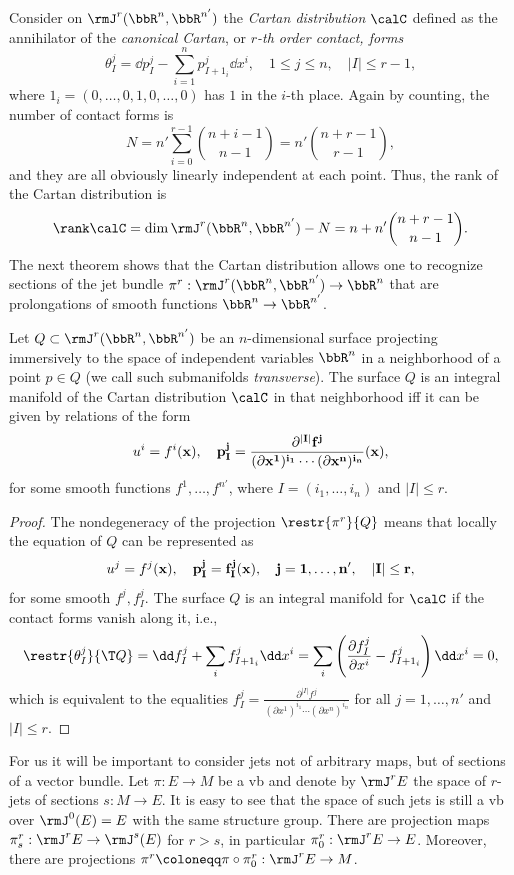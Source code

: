 Consider on $\rmJ^r(\bbR^n,\bbR^{n'})$ the \emph{Cartan distribution} $\calC$ defined as the annihilator of the \emph{canonical Cartan}, or \emph{$r$-th order contact, forms} 
\[\theta^j_I=\dd p^j_I-\sum_{i=1}^n p^j_{I+1_i}\dd x^i,\quad 1\leq j\leq n,\quad |I|\leq r-1,\]
where $1_i=(0,\ldots,0,1,0,\ldots,0)$ has $1$ in the $i$-th place. Again by counting, the number of contact forms is 
\[N=n'\sum_{i=0}^{r-1}\binom{n+i-1}{n-1}=n'\binom{n+r-1}{r-1},\]
and they are all obviously linearly independent at each point. Thus, the rank of the Cartan distribution is
\[\rank\calC=\dim\rmJ^r(\bbR^n,\bbR^{n'})-N=n+n'\binom{n+r-1}{n-1}.\]
The next theorem shows that the Cartan distribution allows one to recognize sections of the jet bundle $\pi^r:\rmJ^r(\bbR^n,\bbR^{n'})\to \bbR^n$ that are prolongations of smooth functions $\bbR^n\to \bbR^{n'}$.

\begin{thm}\label{thm 3.1.1 Kras}
    Let $Q\subset\rmJ^r(\bbR^n,\bbR^{n'})$ be an $n$-dimensional surface projecting immersively to the space of independent variables $\bbR^n$ in a neighborhood of a point $p\in Q$ (we call such submanifolds \emph{transverse}). The surface $Q$ is an integral manifold of the Cartan distribution $\calC$ in that neighborhood iff it can be given by relations of the form 
    \[u^i=f^i(\bf{x}),\quad p^j_I=\frac{\partial^{|I|}f^j}{(\partial x^1)^{i_1}\cdots (\partial x^n)^{i_n}}(\bf{x}),\]
    for some smooth functions $f^1,\ldots,f^{n'}$, where $I=(i_1,\ldots,i_n)$ and $|I|\leq r$.
\end{thm}
\begin{proof}
    The nondegeneracy of the projection $\restr{\pi^r}{Q}$ means that locally the equation of $Q$ can be represented as 
    \[u^j=f^j(\bf{x}),\quad p^j_I=f^j_I(\bf{x}),\quad j=1,\ldots,n',\quad |I|\leq r,\]
    for some smooth $f^j,f^j_I$. The surface $Q$ is an integral manifold for $\calC$ if the contact forms vanish along it, i.e., 
    \[\restr{\theta^j_I}{\T Q}=\dd f^j_I+\sum_i f^j_{I+1_i}\dd x^i=\sum_i \left(\frac{\partial f^j_I}{\partial x^i}-f^j_{I+1_i}\right)\dd x^i=0,\]
    which is equivalent to the equalities $f^j_I=\frac{\partial^{|I|}f^j}{(\partial x^1)^{i_1}\cdots(\partial x^n)^{i_n}}$ for all $j=1,\ldots,n'$ and $|I|\leq r$.
\end{proof}

For us it will be important to consider jets not of arbitrary maps, but of sections of a vector bundle. Let $\pi:E\to M$ be a \gls{vb} and denote by $\rmJ^rE$ the space of $r$-jets of sections $s:M\to E$. It is easy to see that the space of such jets is still a \gls{vb} over $\rmJ^0(E)=E$ with the same structure group. There are projection maps $\pi^r_s:\rmJ^rE\to \rmJ^s(E)$ for $r>s$, in particular $\pi^r_0:\rmJ^rE\to E$. Moreover, there are projections $\pi^r\coloneqq \pi\circ \pi^r_0:\rmJ^rE\to M$.

